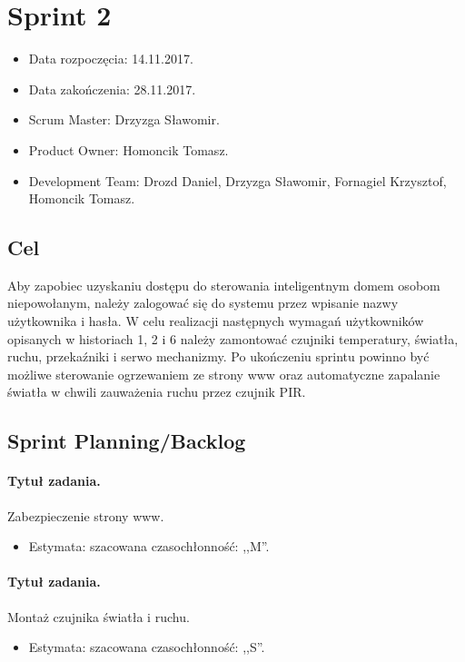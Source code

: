 \section{Sprint 2}
\begin{itemize}
	\item Data rozpoczęcia: 14.11.2017.
	\item Data zakończenia: 28.11.2017.
	\item Scrum Master: Drzyzga Sławomir.
	\item Product Owner: Homoncik Tomasz.
	\item Development Team: Drozd Daniel, Drzyzga Sławomir, Fornagiel Krzysztof, Homoncik Tomasz.
\end{itemize}
\subsection{Cel} 


Aby zapobiec uzyskaniu dostępu do sterowania inteligentnym domem osobom niepowołanym, należy zalogować się do systemu przez wpisanie nazwy użytkownika i hasła. W celu realizacji następnych wymagań użytkowników opisanych w historiach 1, 2 i 6 należy zamontować czujniki temperatury, światła, ruchu, przekaźniki i serwo mechanizmy. Po ukończeniu sprintu powinno być możliwe sterowanie ogrzewaniem ze strony www oraz automatyczne zapalanie światła w chwili zauważenia ruchu przez czujnik PIR. 



\subsection{Sprint Planning/Backlog}

\paragraph{Tytuł zadania.} Zabezpieczenie strony www.
\begin{itemize}
	\item Estymata: szacowana czasochłonność: ,,M''.
\end{itemize}

\paragraph{Tytuł zadania.} Montaż czujnika światła i ruchu.
\begin{itemize}
	\item Estymata: szacowana czasochłonność: ,,S''.
\end{itemize}

